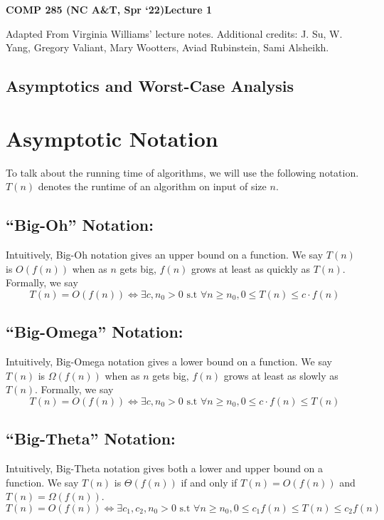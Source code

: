 \documentclass [12pt]{article}
\begin{document}
 

{\LARGE \textbf {COMP 285 (NC A\&T, Spr `22)}\hfill \textbf {Lecture 1} } 
\vspace {1em} 
\begin {Instruction} 

Adapted From Virginia Williams' lecture notes. Additional credits: J. Su, W. Yang, Gregory Valiant, Mary Wootters, Aviad Rubinstein, Sami Alsheikh.
\end {Instruction} 

\begin{centering}
\section*{Asymptotics and Worst-Case Analysis}
\end{centering}


\section{Asymptotic Notation}
To talk about the running time of algorithms, we will use the following notation. $T(n)$ denotes
the runtime of an algorithm on input of size $n$.

\subsection{``Big-Oh'' Notation:}

Intuitively, Big-Oh notation gives an upper bound on a function. We say $T(n)$ is $O(f(n))$ when as $n$ gets big, $f (n)$ grows at least as quickly as $T(n)$. Formally, we say
$$
 T(n) = O(f(n)) \iff \exists c, n_0 > 0 \text{ s.t } \forall n \geq n_0, 0 \leq T(n) \leq c \cdot f(n)
$$

\subsection{``Big-Omega'' Notation:}

Intuitively, Big-Omega notation gives a lower bound on a function. We say $T(n)$ is $\Omega(f(n))$ when as $n$ gets big, $f (n)$ grows at least as slowly as $T(n)$. Formally, we say
$$
 T(n) = O(f(n)) \iff \exists c, n_0 > 0 \text{ s.t } \forall n \geq n_0, 0 \leq c \cdot f(n) \leq T(n)
$$

\subsection{``Big-Theta'' Notation:}

Intuitively, Big-Theta notation gives both a lower and upper bound on a function. We say $T(n)$ is $\Theta(f(n))$ if and only if $T(n) = O(f(n))$ and $T(n) = \Omega(f(n))$.
$$
 T(n) = O(f(n)) \iff \exists c_1, c_2, n_0 > 0 \text{ s.t } \forall n \geq n_0, 0 \leq c_1 f(n) \leq T(n) \leq c_2 f(n)
$$
\end{document}
